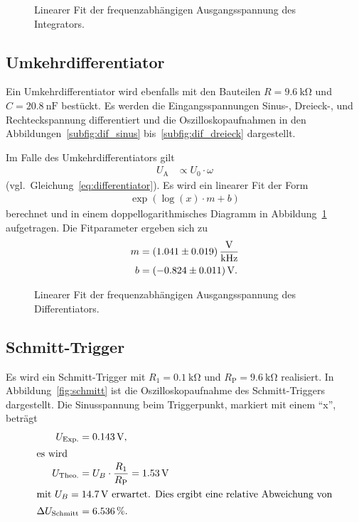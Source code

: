 \begin{figure}[ht]
  \centering
  
  \caption{Linearer Fit der frequenzabhängigen Ausgangsspannung des Integrators.}
  \label{fig:int}
\end{figure}

\subsection{Umkehrdifferentiator}
Ein Umkehrdifferentiator wird ebenfalls mit den Bauteilen $R = \SI{9.6}{\kilo\ohm}$ und $C = \SI{20.8}{\nano\farad}$ bestückt.
Es werden die Eingangsspannungen Sinus-, Dreieck-, und Rechteckspannung differentiert und die Oszilloskopaufnahmen in den Abbildungen~\ref{subfig:dif_sinus} bis~\ref{subfig:dif_dreieck} dargestellt.

Im Falle des Umkehrdifferentiators gilt
\begin{align*}
  U_\text{A} &\propto {U_0} \cdot {\omega}
\end{align*}
(vgl.\ Gleichung~\eqref{eq:differentiator}).
Es wird ein linearer Fit der Form
\begin{align*}
  \exp{\left(\log{\left(x\right)} \cdot m + b\right)}
\end{align*}
berechnet und in einem doppellogarithmisches Diagramm in Abbildung~\ref{fig:int} aufgetragen.
Die Fitparameter ergeben sich zu
\begin{align*}
  m &= \SI{1.041 \pm 0.019}{\volt\per\kilo\hertz} \\
  b &= \SI{-0.824 \pm 0.011}{\volt} .
\end{align*}
\begin{figure}[ht]
  \centering
  
  \caption{Linearer Fit der frequenzabhängigen Ausgangsspannung des Differentiators.}
  \label{fig:dif}
\end{figure}

\subsection{Schmitt-Trigger}
Es wird ein Schmitt-Trigger mit $R_1 = \SI{0.1}{\kilo\ohm}$ und $R_\text{P} = \SI{9.6}{\kilo\ohm}$ realisiert.
In Abbildung~\ref{fig:schmitt} ist die Oszilloskopaufnahme des Schmitt-Triggers dargestellt.
Die Sinusspannung beim Triggerpunkt, markiert mit einem \enquote{x}, beträgt
\begin{align*}
  U_\text{Exp.} &= \SI{0.143}{\volt}, \\
  \intertext{es wird}
  U_\text{Theo.} &= U_B \cdot \frac{R_1}{R_\text{P}} = \SI{1.53}{\volt} \\
  \intertext{mit $U_B = \SI{14.7}{\volt}$ erwartet. Dies ergibt eine relative Abweichung von}
  \Delta U_\text{Schmitt} &= \SI{6.536}{\percent}.
\end{align*}

